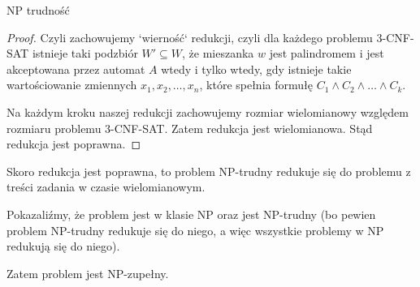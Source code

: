 \documentclass{article}
\theoremstyle{definition}
\theoremstyle{remark}
\begin{document}
\begin{section}{NP trudność}
\begin{proof}
     Czyli zachowujemy `wierność` redukcji, czyli dla każdego problemu 3-CNF-SAT
     istnieje taki podzbiór $W' \subseteq W$, że mieszanka $w$ jest palindromem i
     jest akceptowana przez automat $A$ wtedy i tylko wtedy, gdy istnieje takie
     wartościowanie zmiennych $x_1, x_2, \ldots, x_n$, które spełnia formułę $C_1
         \land C_2 \land \ldots \land C_k$.

     Na każdym kroku naszej redukcji zachowujemy rozmiar wielomianowy względem
     rozmiaru problemu 3-CNF-SAT. Zatem redukcja jest wielomianowa. Stąd redukcja
     jest poprawna.

 \end{proof}

 Skoro redukcja jest poprawna, to problem NP-trudny redukuje się do problemu z
 treści zadania w czasie wielomianowym.

\end{section}

Pokazaliźmy, że problem jest w klasie NP oraz jest NP-trudny (bo pewien problem
NP-trudny redukuje się do niego, a więc wszystkie problemy w NP redukują się do
niego). 

Zatem problem jest NP-zupełny.
\end{document}
